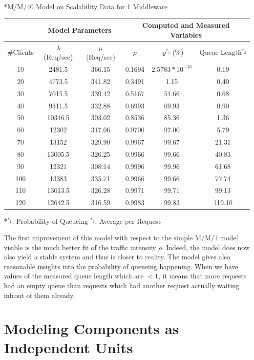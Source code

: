 \documentclass[11pt]{article}
\begin{document}
\begin{center}
	*{M/M/40 Model on Scalability Data for 1 Middleware}
	\begin{tabular}{c|c|c||c|c|c}
		\hline
		& \multicolumn{2}{c||}{Model Parameters} & \multicolumn{3}{c}{Computed and Measured Variables} \\
		\hline
		\#Clients & $\lambda$ (Req/sec) & $\mu$ (Req/sec) & $\rho$ & $\varrho^{*_1}$(\%) & Queue Length$^{*_2}$ \\
		\hline
		10 & 2481.5 & 366.15 & 0.1694 & $2.5783*10^{-13}$ & 0.19\\
		20 & 4773.5 & 341.82 & 0.3491 & 1.15 & 0.40\\
		30 & 7015.5 & 339.42 & 0.5167 & 51.66 & 0.68\\
		40 & 9311.5 & 332.88 & 0.6993 & 69.93 & 0.90\\
		50 & 10346.5 & 303.02 & 0.8536 &85.36 & 1.36\\
		60 & 12302 & 317.06 & 0.9700 & 97.00 & 5.79\\
		70 & 13152 & 329.90 & 0.9967 & 99.67 & 21.31\\
		80 & 13005.5 & 326.25 & 0.9966 & 99.66  & 40.83\\
		90 & 12321 & 308.14 & 0.9996 & 99.96 & 61.68\\
		100 & 13383 & 335.71 & 0.9966 & 99.66 & 77.74\\
		110 & 13013.5 & 326.28 & 0.9971 & 99.71 & 99.13\\
		120 & 12642.5 & 316.59 & 0.9983 & 99.83 & 119.10\\
		\hline		
	\end{tabular}
	*{$^{*_1}$: Probability of Queueing $^{*_2}$: Average per Request}
\end{center}

The first improvement of this model with respect to the simple M/M/1 model visible is the much better fit of the traffic intensity $\rho$. Indeed, the model does now also yield a stable system and thus is closer to reality. The model gives also reasonable insights into the probability of queueing happening. When we have values of the measured queue length which are $<1$, it means that more requests had an empty queue than requests which had another request actually waiting infront of them already.

\section{Modeling Components as Independent Units}\label{sec:independent-units}
\end{document}
